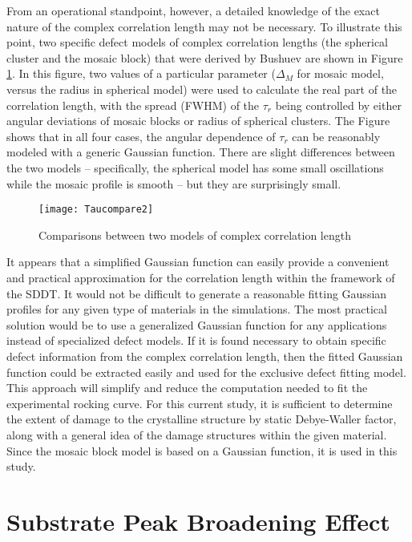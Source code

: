 From an operational standpoint, however, a detailed knowledge of the exact nature of the complex correlation length may not be necessary. To illustrate this point, two specific defect models of complex correlation lengths (the spherical cluster and the mosaic block) that were derived by Bushuev are shown in Figure \ref{taucompare}. In this figure, two values of a particular parameter ($\Delta_M$ for mosaic model, versus the radius in spherical model) were used to calculate the real part of the correlation length, with the spread (FWHM) of the $\tau_r$ being controlled by either angular deviations of mosaic blocks or radius of spherical clusters.  The Figure shows that in all four cases, the angular dependence of $\tau_r$ can be reasonably modeled with a generic Gaussian function.  There are slight differences between the two models -- specifically, the spherical model has some small oscillations while the mosaic profile is smooth -- but they are surprisingly small.
%
\begin{figure}
	\texttt{[image: Taucompare2]}
	\caption{Comparisons between two models of complex correlation length}
	\label{taucompare}
		\end{figure}
%
It appears that a simplified Gaussian function can easily provide a convenient and practical approximation for the correlation length within the framework of the SDDT. It would not be difficult to generate a reasonable fitting Gaussian profiles for any given type of materials in the simulations.  The most practical solution would be to use a generalized Gaussian function for any applications instead of specialized defect models.  If it is found necessary to obtain specific defect information from the complex correlation length, then the fitted Gaussian function could be extracted easily and used for the exclusive defect fitting model.  This approach will simplify and reduce the computation needed to fit the experimental rocking curve.  For this current study, it is sufficient to determine the extent of damage to the crystalline structure by static Debye-Waller factor, along with a general idea of the damage structures within the given material.  Since the mosaic block model is based on a Gaussian function, it is used in this study.

	\section{Substrate Peak Broadening Effect}

